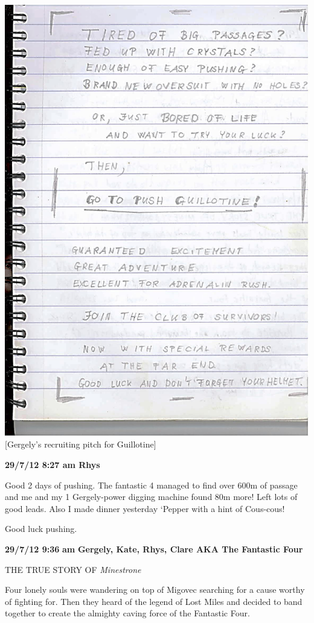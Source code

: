 \includegraphics{UgLog1012/80.jpeg}\\
{[}Gergely's recruiting pitch for Guillotine{]}

\textbf{29/7/12 8:27 am Rhys}

Good 2 days of pushing. The fantastic 4 managed to find over 600m of
passage and me and my 1 Gergely-power digging machine found 80m more!
Left lots of good leads. Also I made dinner yesterday `Pepper with a
hint of Cous-cous!

Good luck pushing.

\textbf{29/7/12 9:36} \textbf{am} \textbf{Gergely, Kate, Rhys, Clare AKA
The Fantastic Four}

THE TRUE STORY OF \emph{Minestrone}

Four lonely souls were wandering on top of Migovec searching for a cause
worthy of fighting for. Then they heard of the legend of Lost Miles and
decided to band together to create the almighty caving force of the
Fantastic Four.

